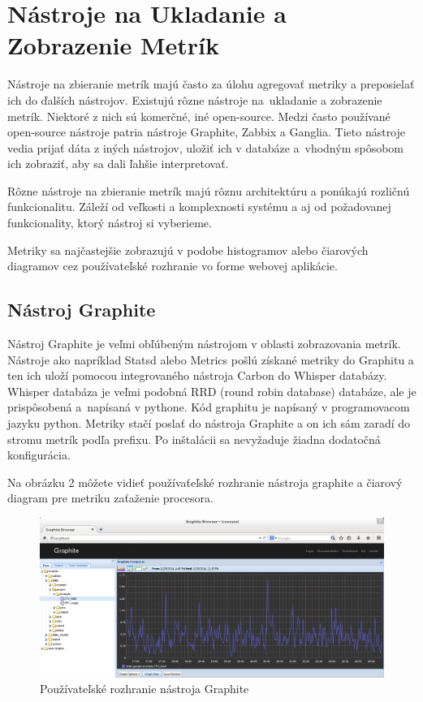 \documentclass[a4paper, usesections, upjsfrontpage, thesismargins, thesislinespacing]{rnthesis}
\begin{document}
\newpage

\section{Nástroje na Ukladanie a Zobrazenie Metrík}

Nástroje na zbieranie metrík majú často za úlohu agregovať metriky a preposielať ich do ďalších nástrojov.
Existujú rôzne nástroje na~ukladanie a zobrazenie metrík.
Niektoré z nich sú komerčné, iné open-source.
Medzi často používané open-source nástroje patria nástroje Graphite, Zabbix a Ganglia.
Tieto nástroje vedia prijať dáta z iných nástrojov, uložiť ich v databáze a~vhodným spôsobom ich zobraziť, aby sa dali ľahšie interpretovať.

Rôzne nástroje na zbieranie metrík majú rôznu architektúru a ponúkajú rozličnú funkcionalitu.
Záleží od veľkosti a komplexnosti systému a aj od požadovanej funkcionality, ktorý nástroj si vyberieme.

Metriky sa najčastejšie zobrazujú v podobe histogramov alebo čiarových diagramov cez používateľské rozhranie vo forme webovej aplikácie.

\subsection{Nástroj Graphite}

Nástroj Graphite je veľmi obľúbeným nástrojom v oblasti zobrazovania metrík.
Nástroje ako napríklad Statsd alebo Metrics pošlú získané metriky do Graphitu a ten ich uloží pomocou integrovaného nástroja Carbon do Whisper databázy. 
Whisper databáza je veľmi podobná RRD (round robin database) databáze, ale je prispôsobená a~napísaná v pythone.
Kód graphitu je napísaný v programovacom jazyku python.
Metriky stačí poslať do nástroja Graphite a on ich sám zaradí do stromu metrík podľa prefixu.
Po inštalácii sa nevyžaduje žiadna dodatočná konfigurácia.

Na obrázku 2 môžete vidieť používaťeľské rozhranie nástroja graphite a čiarový diagram pre metriku zaťaženie procesora.

\begin{figure}
\begin{center}
\includegraphics[scale=0.41]{graphite1.png}
\caption{Používateľské rozhranie nástroja Graphite}
\end{center}
\end{figure}
\end{document}
